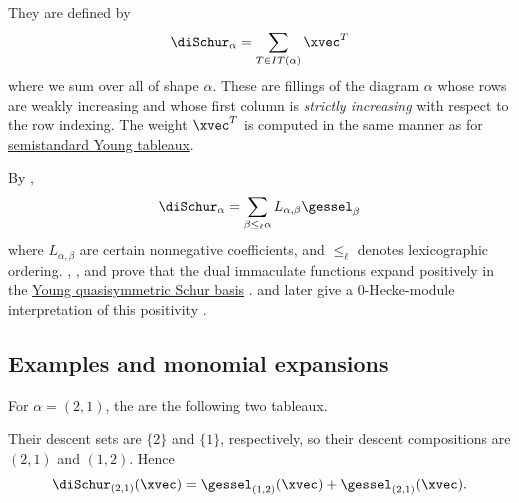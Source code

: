 They are defined by
\[
 \diSchur_\alpha = \sum_{T \in IT(\alpha)} \xvec^T
\]
where we sum over all \label{immaculateTableau} of
shape $\alpha$.
These are fillings of the diagram $\alpha$ whose rows are weakly increasing
and whose first column is \emph{strictly increasing} with respect to the row
indexing.
The weight $\xvec^T$ is computed in the same manner as for
\hyperref[prelimTableaux]{semistandard Young tableaux}.


By \cite[Prop.~3.37]{BergBergeronSaliolaSerranoZabrocki2014},
\[
 \diSchur_\alpha = \sum_{\beta \leq_\ell \alpha} L_{\alpha,\beta} \gessel_\beta
\]
where $L_{\alpha,\beta}$ are certain nonnegative coefficients, and $\leq_\ell$
denotes lexicographic ordering.
, , and  prove that
the dual immaculate functions expand positively in the
\hyperref[yqSchur]{Young quasisymmetric Schur basis}
\cite{AllenHallamMason2018}.   and 
later give a $0$-Hecke-module interpretation of this positivity
\cite{LeeOh2025x}.

\subsection[dualImmaculateExamples]{Examples and monomial expansions}

\begin{example*}
For $\alpha=(2,1)$, the \label{standardImmaculateTableau}
are the following two tableaux.
\begin{figure}
\end{figure}
Their descent sets are $\{2\}$ and $\{1\}$, respectively, so their descent
compositions are $(2,1)$ and $(1,2)$.  Hence
\[
\diSchur_{(2,1)}(\xvec)
= \gessel_{(1,2)}(\xvec)+\gessel_{(2,1)}(\xvec).
\]
\end{example*}

